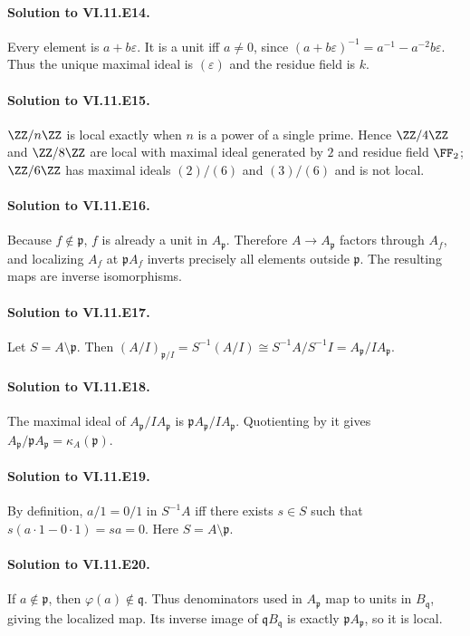 \paragraph{Solution to VI.11.E14.}
Every element is $a+b\varepsilon$.  It is a unit iff $a\neq0$, since $(a+b\varepsilon)^{-1}=a^{-1}-a^{-2}b\varepsilon$.  Thus the unique maximal ideal is $(\varepsilon)$ and the residue field is $k$.

\paragraph{Solution to VI.11.E15.}
$\ZZ/n\ZZ$ is local exactly when $n$ is a power of a single prime.  Hence $\ZZ/4\ZZ$ and $\ZZ/8\ZZ$ are local with maximal ideal generated by $2$ and residue field $\FF_2$; $\ZZ/6\ZZ$ has maximal ideals $(2)/(6)$ and $(3)/(6)$ and is not local.

\paragraph{Solution to VI.11.E16.}
Because $f\notin\mathfrak p$, $f$ is already a unit in $A_{\mathfrak p}$.  Therefore $A\to A_{\mathfrak p}$ factors through $A_f$, and localizing $A_f$ at $\mathfrak pA_f$ inverts precisely all elements outside $\mathfrak p$.  The resulting maps are inverse isomorphisms.

\paragraph{Solution to VI.11.E17.}
Let $S=A\setminus\mathfrak p$.  Then $(A/I)_{\mathfrak p/I}=S^{-1}(A/I)\cong S^{-1}A/S^{-1}I=A_{\mathfrak p}/IA_{\mathfrak p}$.

\paragraph{Solution to VI.11.E18.}
The maximal ideal of $A_{\mathfrak p}/IA_{\mathfrak p}$ is $\mathfrak pA_{\mathfrak p}/IA_{\mathfrak p}$.  Quotienting by it gives $A_{\mathfrak p}/\mathfrak pA_{\mathfrak p}=\kappa_A(\mathfrak p)$.

\paragraph{Solution to VI.11.E19.}
By definition, $a/1=0/1$ in $S^{-1}A$ iff there exists $s\in S$ such that $s(a\cdot1-0\cdot1)=sa=0$.  Here $S=A\setminus\mathfrak p$.

\paragraph{Solution to VI.11.E20.}
If $a\notin\mathfrak p$, then $\varphi(a)\notin\mathfrak q$.  Thus denominators used in $A_{\mathfrak p}$ map to units in $B_{\mathfrak q}$, giving the localized map.  Its inverse image of $\mathfrak qB_{\mathfrak q}$ is exactly $\mathfrak pA_{\mathfrak p}$, so it is local.

